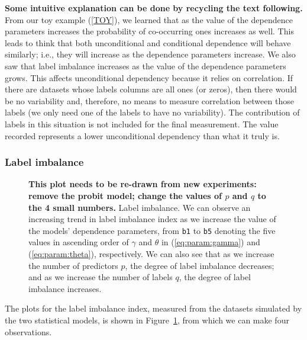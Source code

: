 \documentclass[review]{elsarticle}
\begin{document}
{{\bf Some intuitive explanation can be done by recycling the text following.}
From our toy example (\ref{TOY}), we learned that as the value of the dependence parameters increases the probability of co-occurring ones increases as well. This leads to think that both unconditional and conditional dependence will behave similarly; i.e., they will increase as the dependence parameters increase. We also saw that label imbalance increases as the value of the dependence parameters grows. This affects unconditional dependency because it relies on correlation. If there are datasets whose labels columns are all ones (or zeros), then there would be no variability and, therefore, no means to measure correlation between those labels (we only need one of the labels to have no variability). The contribution of labels in this situation is not included for the final measurement. The value recorded represents a lower unconditional dependency than what it truly is.


\subsubsection{Label imbalance}

\begin{figure}[H]
    \begin{center}
		\end{center}
    \caption{{\bf This plot needs to be re-drawn from new experiments: remove the probit model; change the values of $p$ and $q$ to the 4 small numbers.}  Label imbalance. We can observe an increasing trend in label imbalance index as we increase the value of the models' dependence parameters, from \texttt{b1} to \texttt{b5} denoting the five values in ascending order of $\gamma$ and $\theta$ in (\ref{eq:param:gamma}) and (\ref{eq:param:theta}), respectively. We can also see that as we increase the number of predictors $p$, the degree of label imbalance decreases; and as we increase the number of labels $q$, the degree of label imbalance increases.}
    \label{fig:results:imb}
\end{figure}

The plots for the label imbalance index, measured from the datasets simulated by the two statistical models, is shown in Figure~\ref{fig:results:imb}, from which we can make four observations.

}
\end{document}
